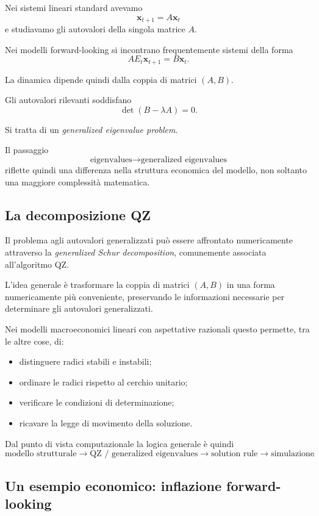 \documentclass{book}
\begin{document}
Nei sistemi lineari standard avevamo
\[
\mathbf{x}_{t+1}=A\mathbf{x}_t
\]
e studiavamo gli autovalori della singola matrice $A$.

Nei modelli forward-looking si incontrano frequentemente sistemi della
forma
\[
A E_t\mathbf{x}_{t+1}
=
B\mathbf{x}_t.
\]

La dinamica dipende quindi dalla coppia di matrici $(A,B)$.

Gli autovalori rilevanti soddisfano
\[
\det(B-\lambda A)=0.
\]

Si tratta di un \emph{generalized eigenvalue problem}.

Il passaggio
\[
\text{eigenvalues}
\longrightarrow
\text{generalized eigenvalues}
\]
riflette quindi una differenza nella struttura economica del modello,
non soltanto una maggiore complessità matematica.


\subsection{La decomposizione QZ}

Il problema agli autovalori generalizzati può essere affrontato
numericamente attraverso la \emph{generalized Schur decomposition},
comunemente associata all'algoritmo QZ.

L'idea generale è trasformare la coppia di matrici $(A,B)$ in una forma
numericamente più conveniente, preservando le informazioni necessarie
per determinare gli autovalori generalizzati.

Nei modelli macroeconomici lineari con aspettative razionali questo
permette, tra le altre cose, di:

\begin{itemize}
    \item distinguere radici stabili e instabili;
    \item ordinare le radici rispetto al cerchio unitario;
    \item verificare le condizioni di determinazione;
    \item ricavare la legge di movimento della soluzione.
\end{itemize}

Dal punto di vista computazionale la logica generale è quindi
\[
\boxed{
\text{modello strutturale}
\longrightarrow
\text{QZ / generalized eigenvalues}
\longrightarrow
\text{solution rule}
\longrightarrow
\text{simulazione}
}.
\]


\subsection{Un esempio economico: inflazione forward-looking}
\end{document}

